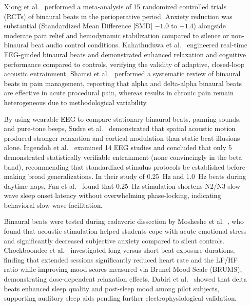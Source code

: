 \documentclass[12pt, a4paper]{report}
\begin{document}
Xiong et al.~\cite{Xiong2025} performed a meta-analysis of 15 randomized controlled trials (RCTs) of binaural beats in the perioperative period. Anxiety reduction was substantial (Standardized Mean Difference [SMD] $-1.0$ to $-1.4$) alongside moderate pain relief and hemodynamic stabilization compared to silence or non-binaural beat audio control conditions. Kahathuduwa et al.~\cite{KahathuduwaBlume2025} engineered real-time EEG-guided binaural beats and demonstrated enhanced relaxation and cognitive performance compared to controls, verifying the validity of adaptive, closed-loop acoustic entrainment. Shamsi et al.~\cite{Shamsi2024} performed a systematic review of binaural beats in pain management, reporting that alpha and delta-alpha binaural beats are effective in acute procedural pain, whereas results in chronic pain remain heterogeneous due to methodological variability.

By using wearable EEG to compare stationary binaural beats, panning sounds, and pure-tone beeps, Sudre et al.~\cite{Sudre2024} demonstrated that spatial acoustic motion produced stronger relaxation and cortical modulation than static beat illusions alone. Ingendoh et al.~\cite{Ingendoh2023} examined 14 EEG studies and concluded that only 5 demonstrated statistically verifiable entrainment (none convincingly in the beta band), recommending that standardized stimulus protocols be established before making broad generalizations. In their study of 0.25~Hz and 1.0~Hz beats during daytime naps, Fan et al.~\cite{Fan2024} found that 0.25~Hz stimulation shortens N2/N3 slow-wave sleep onset latency without overwhelming phase-locking, indicating behavioral slow-wave facilitation.

Binaural beats were tested during cadaveric dissection by Mosheshe et al.~\cite{Mosheshe2024}, who found that acoustic stimulation helped students cope with acute emotional stress and significantly decreased subjective anxiety compared to silent controls. Chockboondee et al.~\cite{ChockboondeeJatupornpoonsub2023} investigated long versus short beat exposure durations, finding that extended sessions significantly reduced heart rate and the LF/HF ratio while improving mood scores measured via Brunel Mood Scale (BRUMS), demonstrating dose-dependent relaxation effects. Dabiri et al.~\cite{Dabiri2022} showed that delta beats enhanced sleep quality and post-sleep mood among pilot subjects, supporting auditory sleep aids pending further electrophysiological validation.
\end{document}
